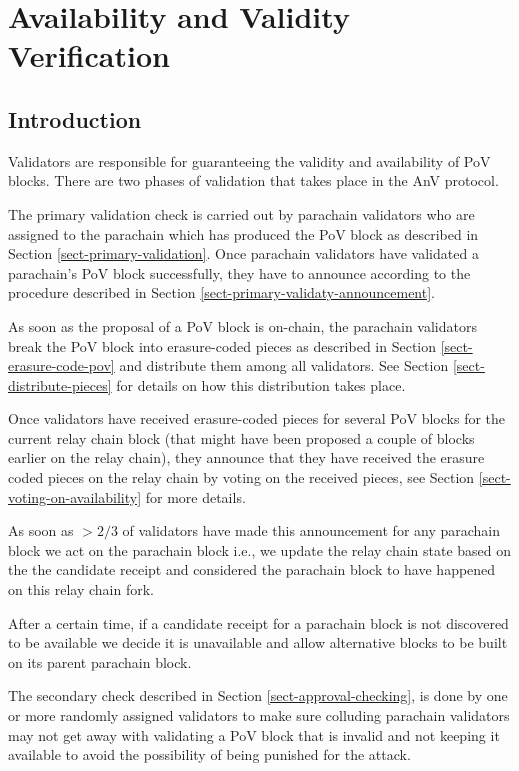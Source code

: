 \chapter{Availability and Validity Verification}

\section{Introduction}

Validators are responsible for guaranteeing the validity and availability of PoV blocks. 
There are two phases of validation that takes place in the AnV protocol. 

The primary validation check is carried out by parachain validators who are assigned to the parachain which has produced the PoV block as described in Section \ref{sect-primary-validation}. Once parachain validators have validated a parachain's PoV block successfully, they have to announce according to the procedure described in Section \ref{sect-primary-validaty-announcement}.

As soon as the proposal of a PoV block is on-chain, the parachain validators break the PoV block into erasure-coded pieces as described in Section \ref{sect-erasure-code-pov} and distribute them among all validators. See Section \ref{sect-distribute-pieces} for details on how this distribution takes place.
	 
Once validators have received erasure-coded pieces for several PoV blocks for the current relay chain block (that might have been proposed a couple of blocks earlier on the relay chain), they announce that they have received the erasure coded pieces on the relay chain by voting on the received pieces, see Section \ref{sect-voting-on-availability} for more details. 

As soon as $>2/3$ of validators have made this announcement for any parachain block we act on the parachain block i.e., we update the relay chain state based on the the candidate receipt and considered the parachain block to have happened on this relay chain fork. 

After a certain time, if a candidate receipt for a parachain block is not discovered to be available we decide it is unavailable and allow alternative blocks to be built on its parent parachain block. 

The secondary check described in Section \ref{sect-approval-checking}, is done by one or more randomly assigned validators to make sure colluding parachain validators may not get away with validating a PoV block that is invalid and not keeping it available to avoid the possibility of being punished for the attack.

